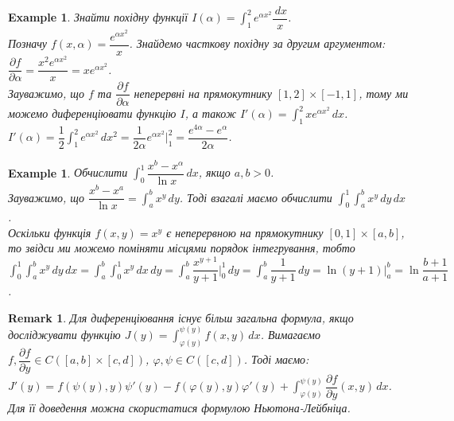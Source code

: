\documentclass[a4paper, 10pt]{article}
\def\departial#1#2{\dfrac{\partial {#1}}{\partial {#2}}}
\def\huge{\displaystyle}
\theoremstyle{theoremdd}
\theoremstyle{theoremdd}
\theoremstyle{theoremdd}
\theoremstyle{theoremdd}
\newtheorem{example}[theorem]{Example}
\theoremstyle{theoremdd}
\theoremstyle{theoremdd}
\newtheorem{remark}[theorem]{Remark}
\theoremstyle{theoremdd}
\theoremstyle{theoremdd}
\begin{document}
\begin{example}
Знайти похідну функції $I(\alpha) = \huge\int_1^2 e^{\alpha x^2} \dfrac{\,dx}{x}$.\\
Позначу $f(x,\alpha) = \dfrac{e^{\alpha x^2}}{x}$. Знайдемо часткову похідну за другим аргументом: $\departial{f}{\alpha} = \dfrac{x^2 e^{\alpha x^2}}{x} = x e^{\alpha x^2}$.\\
Зауважимо, що $f$ та $\departial{f}{\alpha}$ неперервні на прямокутнику $[1,2] \times [-1,1]$, тому ми можемо диференціювати функцію $I$, а також $I'(\alpha) = \huge\int_1^2 x e^{\alpha x^2}\,dx$.\\
$I'(\alpha) = \huge \dfrac{1}{2} \int_1^2 e^{\alpha x^2}\,dx^2 = \dfrac{1}{2\alpha} e^{\alpha x^2} \Big|_1^2 = \dfrac{e^{4\alpha}-e^{\alpha}}{2\alpha}$.
\end{example}

\begin{example}
Обчислити $\huge\int_0^1 \dfrac{x^b - x^\alpha}{\ln x}\,dx$, якщо $a,b>0$.\\
Зауважимо, що $\dfrac{x^b - x^a}{\ln x} = \huge\int_a^b x^y\,dy$. Тоді взагалі маємо обчислити $\huge\int_0^1 \int_a^b x^y \,dy \,dx$.\\
Оскільки функція $f(x,y) = x^y$ є неперервною на прямокутнику $[0,1] \times [a,b]$, то звідси ми можемо поміняти місцями порядок інтегрування, тобто\\
$\huge\int_0^1 \int_a^b x^y \,dy \,dx = \int_a^b \int_0^1 x^y\,dx\,dy = \int_a^b \dfrac{x^{y+1}}{y+1}\Big|_0^1\,dy = \int_a^b \dfrac{1}{y+1}\,dy = \ln (y+1) \Big|_a^b = \ln \dfrac{b+1}{a+1}$.
\end{example}

\begin{remark}
Для диференціювання існує більш загальна формула, якщо досліджувати функцію $J(y) = \huge\int_{\varphi(y)}^{\psi(y)} f(x,y)\,dx$. Вимагаємо $f, \departial{f}{y} \in C([a,b] \times [c,d])$, $\varphi,\psi \in C([c,d])$. Тоді маємо:\\
$J'(y) = f(\psi(y),y)\psi'(y) - f(\varphi(y),y)\varphi'(y) + \huge\int_{\varphi(y)}^{\psi(y)} \departial{f}{y}(x,y)\,dx$.\\
Для її доведення можна скористатися формулою Ньютона-Лейбніца.
\end{remark}
\end{document}
